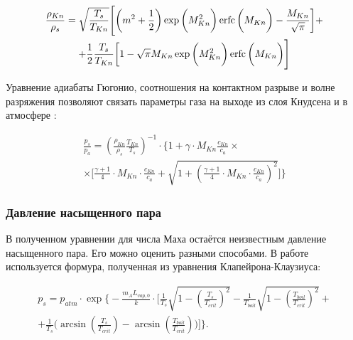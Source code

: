 \begin{multline}
\label{eq:densjump}
    \frac{\rho_{Kn}}{\rho_s} = \sqrt{\frac{T_s}{T_{Kn}}} \Bigg[ \bigg( m^2 + \frac{1}{2} \bigg) \exp\bigg(M_{Kn}^2\bigg)\operatorname{erfc}\bigg(M_{Kn}\bigg) - \frac{M_{Kn}}{\sqrt{\pi}} \bigg] + \\ + \frac{1}{2} \frac{T_s}{T_{Kn}} \bigg[ 1 - \sqrt{\pi}M_{Kn}\exp\bigg(M_{Kn}^2\bigg)\operatorname{erfc}\bigg(M_{Kn}\bigg) \Bigg]
\end{multline}



Уравнение адиабаты Гюгонио, соотношения на контактном разрыве и волне разряжения позволяют связать параметры газа на выходе из слоя Кнудсена и в атмосфере \cite{klassen2018simulation}:

\begin{multline}
\label{eq:rh}
    \frac{p_s}{p_a} = \left( \frac{\rho_{Kn}}{\rho_s} \frac{T_{Kn}}{T_s} \right)^{-1} \cdot \Bigg\{1 + \gamma \cdot M_{Kn} \frac{c_{Kn}}{c_a} \times \\ \times \Bigg[ \frac{\gamma + 1}{4} \cdot M_{Kn} \cdot \frac{c_{Kn}}{c_a} + \sqrt{1 + \left( \frac{\gamma + 1}{4} \cdot M_{Kn} \cdot \frac{c_{Kn}}{c_a} \right)^2} \Bigg] \Bigg\}
\end{multline}

\subsubsection{Давление насыщенного пара}

В полученном уравнении для числа Маха остаётся неизвестным давление насыщенного пара. Его можно оценить разными способами. В работе \cite{klassen2018simulation} используется формура, полученная из уравнения Клапейрона-Клаузиуса:

\begin{multline}
\label{eq:cc}
    p_s = p_{atm}\cdot\exp \Bigg\{ -\frac{m_A L_{vap,0}}{k} \cdot \Bigg[ \frac{1}{T_s} \sqrt{1 - \left( \frac{T_s}{T_{crit}} \right)^2} - \frac{1}{T_{boil}} \sqrt{1 - \left( \frac{T_{boil}}{T_{crit}} \right)^2} + \\ + \frac{1}{T_s} \bigg( \arcsin \left( \frac{T_s}{T_{crit}} \right) - \arcsin\left(\frac{T_{boil}}{T_{crit}} \right)\bigg) \Bigg] \Bigg\}.
\end{multline}

